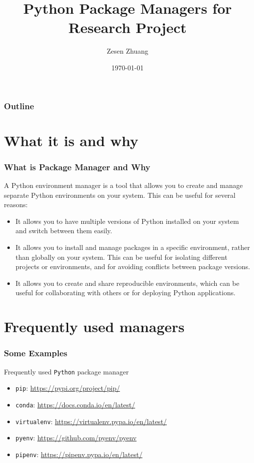 \documentclass{beamer}
\title{Python Package Managers for Research Project}
\author{Zesen Zhuang}
\institute{SciEcon CIC}
\date{\today}
\begin{document}
\begin{frame}
  \titlepage
\end{frame}

\begin{frame}
  \frametitle{Outline}
  \tableofcontents
\end{frame}

\section{What it is and why}

\begin{frame}
  \frametitle{What is Package Manager and Why}

  A Python environment manager is a tool that allows you to create and manage separate Python environments on your system. This can be useful for several reasons:

  \begin{itemize}
    \item It allows you to have multiple versions of Python installed on your system and switch between them easily.
    \item It allows you to install and manage packages in a specific environment, rather than globally on your system. This can be useful for isolating different projects or environments, and for avoiding conflicts between package versions.
    \item It allows you to create and share reproducible environments, which can be useful for collaborating with others or for deploying Python applications.
  \end{itemize}

\end{frame}

\section{Frequently used managers}

\begin{frame}
  \frametitle{Some Examples}

  Frequently used \texttt{Python} package manager

  \begin{itemize}
    \item \texttt{pip}: \url{https://pypi.org/project/pip/}
    \item \texttt{conda}: \url{https://docs.conda.io/en/latest/}
    \item \texttt{virtualenv}: \url{https://virtualenv.pypa.io/en/latest/}
    \item \texttt{pyenv}: \url{https://github.com/pyenv/pyenv}
    \item \texttt{pipenv}: \url{https://pipenv.pypa.io/en/latest/}
  \end{itemize}

\end{frame}
\end{document}
